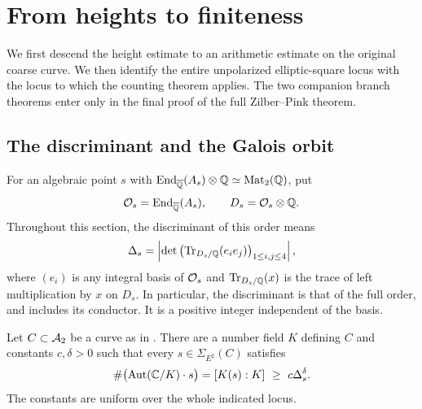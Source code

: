 \section{From heights to finiteness}\label{fin:section}

We first descend the height estimate to an arithmetic estimate on the
original coarse curve.  We then identify the entire unpolarized
elliptic-square locus with the locus to which the counting theorem
applies. The two companion branch theorems enter only in the final
proof of the full Zilber--Pink theorem.

\subsection{The discriminant and the Galois orbit}

For an algebraic point $s$ with
$\operatorname{End}_{\overline{\mathbb Q}}(A_s)\otimes\mathbb Q\simeq\operatorname{Mat}_2(\mathbb Q)$, put
\[
 \mathcal O_s=\operatorname{End}_{\overline{\mathbb Q}}(A_s),\qquad D_s=\mathcal O_s\otimes\mathbb Q.
\]
Throughout this section, the discriminant of this order means
\begin{equation}\label{fin:disc-definition}
 \Delta_s=
 \left|\det\left(\operatorname{Tr}_{D_s/\mathbb Q}(e_i e_j)\right)_{1\leq i,j\leq4}\right|,
\end{equation}
where $(e_i)$ is any integral basis of $\mathcal O_s$ and
$\operatorname{Tr}_{D_s/\mathbb Q}(x)$ is the trace of left multiplication by $x$ on $D_s$.
In particular, the discriminant is that of the full order, and includes
its conductor.  It is a positive integer independent of the basis.

\begin{proposition}\label{fin:orbit}
Let $C\subset\mathcal A_2$ be a curve as in .
There are a number field $K$ defining $C$ and constants $c,\delta>0$
such that every $s\in\Sigma_{E^2}(C)$ satisfies
\begin{equation}\label{fin:orbit-bound}
 \#\bigl(\operatorname{Aut}(\mathbb C/K)\cdot s\bigr)
   =[K(s):K]\ \geq\ c\Delta_s^\delta.
\end{equation}
The constants are uniform over the whole indicated locus.
\end{proposition}

